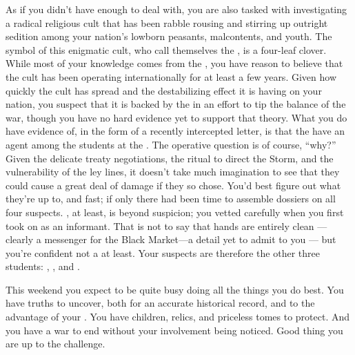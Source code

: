\documentclass[char]{GL2020}
\begin{document}
As if you didn't have enough to deal with, you are also tasked with investigating a radical religious cult that has been rabble rousing and stirring up outright sedition among your nation's lowborn peasants, malcontents, and youth. The symbol of this enigmatic cult, who call themselves the \pGoaties{}, is a four-leaf clover. While most of your knowledge comes from the \pFarm{}, you have reason to believe that the cult has been operating internationally for at least a few years. Given how quickly the cult has spread and the destabilizing effect it is having on your nation, you suspect that it is backed by the \pShip{} in an effort to tip the balance of the war, though you have no hard evidence yet to support that theory. What you do have evidence of, in the form of a recently intercepted letter, is that the \pGoaties{} have an agent among the \pFarm{} students at the \pSchool{}. The operative question is of course, ``why?'' Given the delicate treaty negotiations, the ritual to direct the Storm, and the vulnerability of the ley lines, it doesn't take much imagination to see that they could cause a great deal of damage if they so chose. You'd best figure out what they're up to, and fast; if only there had been time to assemble dossiers on all four suspects. \cLibAssist{}, at least, is beyond suspicion; you vetted \cLibAssist{\them} carefully when you first took \cLibAssist{\them} on as an informant. That is not to say that \cLibAssist{\their} hands are entirely clean — \cLibAssist{\theyare} clearly a messenger for the Black Market---a detail \cLibAssist{\they} \cLibAssist{\have} yet to admit to you — but you're confident \cLibAssist{\theyare} not a \pGoatie{} at least. Your suspects are therefore the other three \pFarm{} students: \cChupStudent{\full}, \cAdopted{\full}, and \cDisney{\full}.

This weekend you expect to be quite busy doing all the things you do best. You have truths to uncover, both for an accurate historical record, and to the advantage of your \cQueen{\Majesty}. You have children, relics, and priceless tomes to protect. And you have a war to end without your involvement being noticed. Good thing you are up to the challenge.
\end{document}
